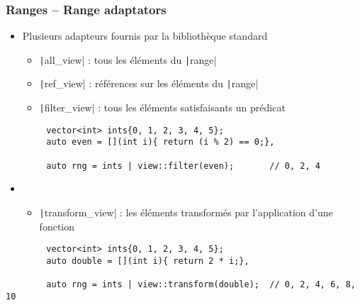 \documentclass[C++.tex]{subfiles}
\begin{document}
\begin{frame}[fragile]
	\frametitle{Ranges -- Range adaptators}
	\begin{itemize}
		\item Plusieurs adapteurs fournis par la bibliothèque standard


		\begin{itemize}
			\item \texttt|all_view| : tous les éléments du \texttt|range|
			\item \texttt|ref_view| : références sur les éléments du \texttt|range|
			\item \texttt|filter_view| : tous les éléments satisfaisants un prédicat
		\end{itemize}
	\end{itemize}

	\begin{verbatim}
		vector<int> ints{0, 1, 2, 3, 4, 5};
		auto even = [](int i){ return (i % 2) == 0;},

		auto rng = ints | view::filter(even);       // 0, 2, 4
	\end{verbatim}

	\begin{itemize}
		\item [] \begin{itemize}
			\item \texttt|transform_view| : les éléments transformés par l'application d'une fonction
		\end{itemize}
	\end{itemize}

	\begin{verbatim}
		vector<int> ints{0, 1, 2, 3, 4, 5};
		auto double = [](int i){ return 2 * i;},

		auto rng = ints | view::transform(double);  // 0, 2, 4, 6, 8, 10
	\end{verbatim}
\end{frame}
\end{document}
